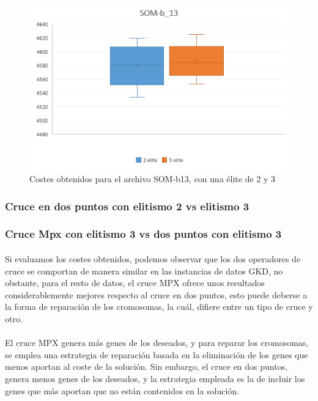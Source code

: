 	\begin{figure}[H]
		\centering
		\includegraphics[scale=0.7]{img/MPX_2vs3/SOM-b_13_Costes}
		\caption{Costes obtenidos para el archivo SOM-b13, con una élite de 2 y 3}
		\label{som-b13_coste}
		
		
	\end{figure}


	\subsubsection{Cruce en dos puntos con elitismo 2 vs elitismo 3}
	\paragraph{}
	
	
	
	\subsubsection{Cruce Mpx con elitismo 3 vs dos puntos con elitismo 3}
	
	\paragraph{} Si evaluamos los costes obtenidos, podemos observar que los dos operadores de cruce se comportan de manera similar en las instancias de datos GKD, no obstante, para el resto de datos, el cruce MPX ofrece unos resultados considerablemente mejores respecto al cruce en dos puntos, esto puede deberse a la forma de reparación de los cromosomas, la cuál, difiere entre un tipo de cruce y otro.
	
	\paragraph{}El cruce MPX genera más genes de los deseados, y para reparar los cromosomas, se emplea una estrategia de reparación basada en la eliminación de los genes que menos aportan al coste de la solución. Sin embargo, el cruce en dos puntos, genera menos genes de los deseados, y la estrategia empleada es la de incluir los genes que más aportan que no están contenidos en la solución.
	
